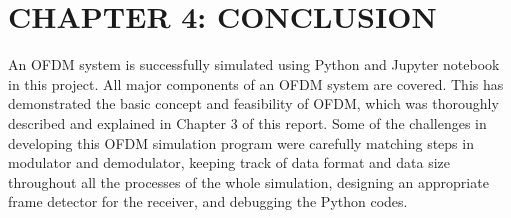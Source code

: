\section*{CHAPTER 4: CONCLUSION}
\setcounter{section}{4}
\setcounter{subsection}{0}
\setcounter{figure}{0}
\setcounter{table}{0}

An OFDM system is successfully simulated using Python and Jupyter notebook in this project. All major components of an OFDM system are covered. This has demonstrated the basic concept and feasibility of OFDM, which was thoroughly described and explained in Chapter 3 of this report. Some of the challenges in developing this OFDM simulation program were carefully matching steps in modulator and demodulator, keeping track of data format and data size throughout all the processes of the whole simulation, designing an appropriate frame detector for the receiver, and debugging the Python codes.

\newpage